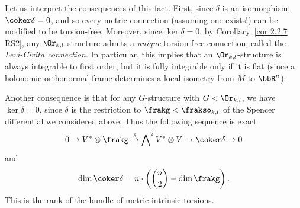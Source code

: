 \begin{example}
    Let us interpret the consequences of this fact. First, since $\delta$ is an isomorphism, $\coker\delta=0$, and so every metric connection (assuming one exists!) can be modified to be torsion-free. Moreover, since $\ker\delta=0$, by Corollary~\ref{cor 2.2.7 RS2}, any $\Or_{k,l}$-structure admits a \emph{unique} torsion-free connection, called the \emph{Levi-Civita connection}.  In particular, this implies that an $\Or_{k,l}$-structure is always integrable to first order, but it is fully integrable only if it is flat (since a holonomic orthonormal frame determines a local isometry from $M$ to $\bbR^n$).

    Another consequence is that for any $G$-structure with $G<\Or_{k,l}$, we have $\ker\delta=0$, since $\delta$ is the restriction to $\frakg<\frakso_{k,l}$ of the Spencer differential we considered above. Thus the following  sequence is exact 
    \[0\to V^\ast\otimes \frakg\overset{\delta}{\to}\bigwedge\nolimits^2 V^\ast\otimes V\to \coker\delta\to 0\]
    and 
    \[\dim\coker\delta =n\cdot \left(\binom{n}{2}-\dim\frakg\right).\]
    This is the rank of the bundle of metric intrinsic torsions.
\end{example}


